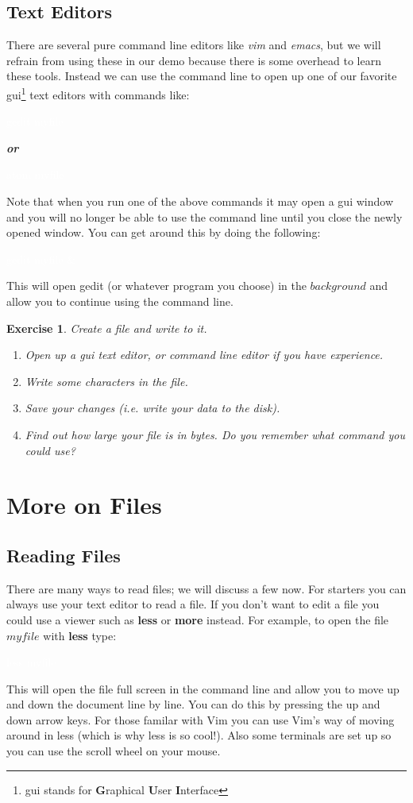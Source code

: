 \documentclass[oneside]{book}
\newcommand{\commandline}[1]{\begin{center} \colorbox{Dark}{\textcolor{white}{#1}} \end{center}}
\newtheorem{ex}{Exercise}[chapter]
\begin{document}
\subsection{Text Editors}
There are several pure command line editors like \textit{vim} and \textit{emacs}, but we will refrain from using these in our demo because there is some overhead to learn these tools. Instead we can use the command line to open up one of our favorite gui\footnote{gui stands for \textbf{G}raphical \textbf{U}ser \textbf{I}nterface} text editors with commands like: 
\commandline{gedit myfile}
\begin{center}
    \textbf{\textit{or}}
\end{center}
\commandline{atom myfile}
Note that when you run one of the above commands it may open a gui window and you will no longer be able to use the command line until you close the newly opened window. You can get around this by doing the following:
\commandline{gedit myfile \&}
This will open gedit (or whatever program you choose) in the $background$ and allow you to continue using the command line. \\

\begin{ex} Create a file and write to it.
    \begin{enumerate}
        \item Open up a gui text editor, or command line editor if you have experience.
        \item Write some characters in the file.
        \item Save your changes (i.e. write your data to the disk).
        \item Find out how large your file is in bytes. Do you remember what command you could use?
    \end{enumerate}
    
\end{ex}

\section{More on Files}

\subsection{Reading Files}
	There are many ways to read files; we will discuss a few now. For starters you can always use your text editor to read a file. If you don't want to edit a file you could use a viewer such as \textbf{less} or \textbf{more} instead.
	For example, to open the file $myfile$ with \textbf{less} type:
\commandline{less myfile}
This will open the file full screen in the command line and allow you to move up and down the document line by line. You can do this by pressing the up and down arrow keys. For those familar with Vim you can use Vim's way of moving around in less (which is why less is so cool!). Also some terminals are set up so you can use the scroll wheel on your mouse. 
\end{document}

